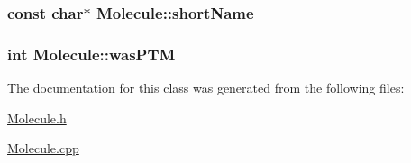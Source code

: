 \label{classMolecule_a3e3be6cd7b1286e8d8d489642ab19641}
\hypertarget{classMolecule_ae79f60ef35ffcb500e91013f59563e03}{
\subsubsection[{shortName}]{\setlength{\rightskip}{0pt plus 5cm}const char$\ast$ {\bf Molecule::shortName}}}
\label{classMolecule_ae79f60ef35ffcb500e91013f59563e03}
\hypertarget{classMolecule_a134dd5ffa71953792912c7b0cca01405}{
\subsubsection[{wasPTM}]{\setlength{\rightskip}{0pt plus 5cm}int {\bf Molecule::wasPTM}}}
\label{classMolecule_a134dd5ffa71953792912c7b0cca01405}


The documentation for this class was generated from the following files:\begin{DoxyCompactItemize}
\item 
\hyperlink{Molecule_8h}{Molecule.h}\item 
\hyperlink{Molecule_8cpp}{Molecule.cpp}\end{DoxyCompactItemize}
